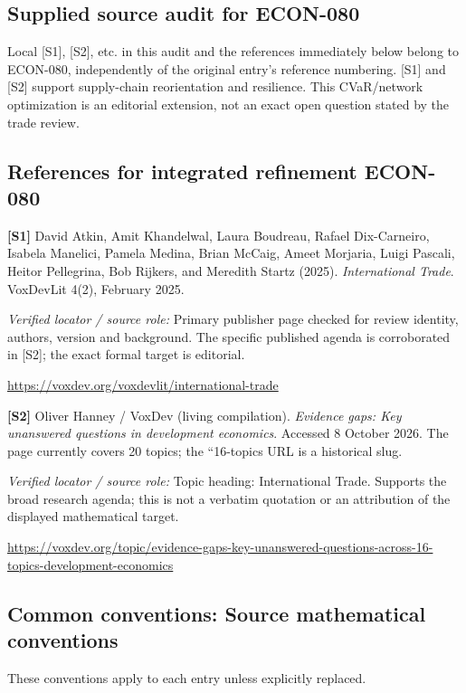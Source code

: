 \documentclass[11pt,a4paper]{article}
\begin{document}
\subsection*{Supplied source audit for ECON-080}
Local [S1], [S2], etc. in this audit and the references immediately below
belong to ECON-080, independently of the original entry's reference numbering.
[S1] and [S2] support supply-chain reorientation and resilience. This CVaR/network optimization is an editorial extension, not an exact open question stated by the trade review.
\subsection*{References for integrated refinement ECON-080}
{\footnotesize\raggedright
\par\noindent\textbf{[S1]} David Atkin, Amit Khandelwal, Laura Boudreau, Rafael Dix-Carneiro, Isabela Manelici, Pamela Medina, Brian McCaig, Ameet Morjaria, Luigi Pascali, Heitor Pellegrina, Bob Rijkers, and Meredith Startz (2025). \emph{International Trade}. VoxDevLit 4(2), February 2025.\par \textit{Verified locator / source role:} Primary publisher page checked for review identity, authors, version and background. The specific published agenda is corroborated in [S2]; the exact formal target is editorial.\par \url{https://voxdev.org/voxdevlit/international-trade}\par\smallskip
\par\noindent\textbf{[S2]} Oliver Hanney / VoxDev (living compilation). \emph{Evidence gaps: Key unanswered questions in development economics}. Accessed 8 October 2026. The page currently covers 20 topics; the ``16-topics URL is a historical slug.\par \textit{Verified locator / source role:} Topic heading: International Trade. Supports the broad research agenda; this is not a verbatim quotation or an attribution of the displayed mathematical target.\par \url{https://voxdev.org/topic/evidence-gaps-key-unanswered-questions-across-16-topics-development-economics}\par\smallskip
}

\subsection*{Common conventions: Source mathematical conventions}

These conventions apply to each entry unless explicitly replaced.
\end{document}

